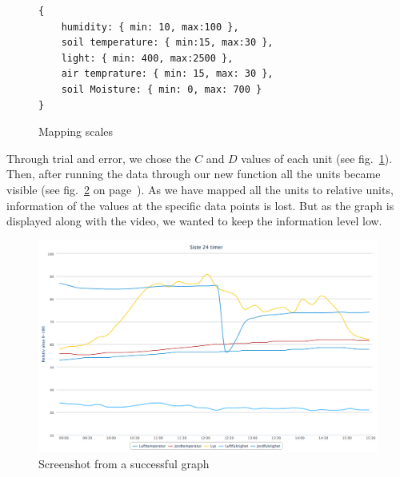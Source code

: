 
\begin{figure}
	\begin{lstlisting}[style=htmlcssjs]
{
	humidity: { min: 10, max:100 },
	soil temperature: { min:15, max:30 },
	light: { min: 400, max:2500 },
	air temprature: { min: 15, max: 30 },
	soil Moisture: { min: 0, max: 700 }
}
	\end{lstlisting}
	\caption{Mapping scales}
	\label{fig:mapscale}
\end{figure}

Through trial and error, we chose the \ensuremath{C} and \ensuremath{D} values of each unit (see fig.~\ref{fig:mapscale}). Then, after running the data through our new function all the units became visible (see fig.~\ref{fig:goodgraph} on page~\pageref{fig:goodgraph}). As we have mapped all the units to relative units, information of the values at the specific data points is lost. But as the graph is displayed along with the video, we wanted to keep the information level low.  

\begin{figure}
\centering
\includegraphics[width=1\textwidth]{img/interface/goodgraph.png}
\caption{Screenshot from a successful graph}
\label{fig:goodgraph}
\end{figure}


